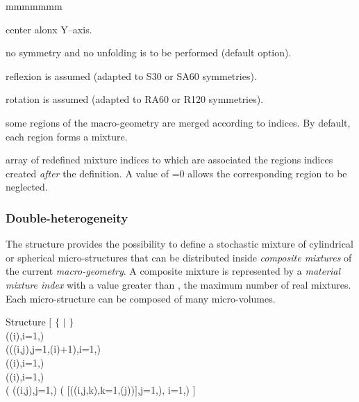 \begin{ListeDeDescription}{mmmmmmm}
\item[\dusa{y0}] center alonx Y--axis.

\item[\moc{NONE}] no symmetry and no unfolding is to be performed (default option).

\item[\moc{REFL}] reflexion is assumed (adapted to S30 or SA60 symmetries).

\item[\moc{ROTA}] rotation is assumed (adapted to RA60 or R120 symmetries).

\item[\moc{REMIX}] some regions of the macro-geometry are merged according to  indices. By default, each region forms a mixture.

\item[\dusa{imix2}] array of redefined mixture indices to which are associated the regions indices created {\sl after} the  definition. A value of =0 allows the corresponding region to be neglected.

\end{ListeDeDescription}

\subsubsection{Double-heterogeneity}\label{sect:descDH}

The structure  provides the possibility to define a stochastic mixture of cylindrical or spherical micro-structures that can be distributed inside {\sl composite mixtures} of the current {\sl macro-geometry}. A composite mixture is represented by a {\sl material mixture index} with a value greater than , the maximum number of real mixtures. Each micro-structure can be composed of many micro-volumes.\cite{BIHET}

\begin{DataStructure}{Structure }
$[$   $\{$  $|$  $\}$ 
 \\
\hskip 1.0cm ((i),i=1,) \\
\hskip 1.0cm(((i,j),j=1,(i)+1),i=1,)\\
\hskip 1.0cm((i),i=1,)\\
\hskip 1.0cm((i),i=1,)\\
\hskip 1.0cm( ((i,j),j=1,) 
( $[$((i,j,k),k=1,(j))$]$,j=1,), i=1,) $]$
\end{DataStructure}

